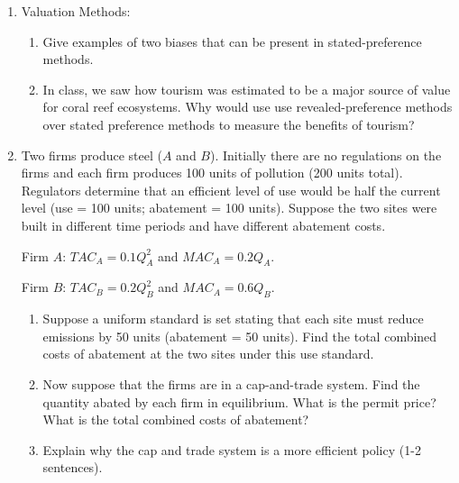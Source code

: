 \documentclass[11pt]{article}
\newcommand{\answer}[1]{\iftoggle{INCLUDEANSWERS}{{\color{violet!70!white}\textbf{Solution:} #1}}{} }
\newcommand{\points}[1]{\iftoggle{INCLUDEPOINTS}{{\color{blue!70!white}(#1 pts.)}}{}}
\begin{document}
\begin{enumerate}
  \item \points{10} Valuation Methods:
  \begin{enumerate}
    \item Give examples of two biases that can be present in stated-preference methods.
    \item In class, we saw how tourism was estimated to be a major source of value for coral reef ecosystems. Why would use use revealed-preference methods over stated preference methods to measure the benefits of tourism?
  \end{enumerate}

  \answer{
    \begin{enumerate}
      \item Strategic bias (lie to try and influence the policy decision), Information bias (don't know enough to put a price on something), Starting point bias (get told an initial number which frames their answer), hypothetical bias (people answer without considering what they actually would pay), status quo bias (need to be payed more to lose something that they already have)
      \item The hypothetical bias means people won't reveal what they actually would pay to preserve the coral reef. Revealed-preference is better in this case since you observe how much people actually paid to see the coral reef.
    \end{enumerate}
  }

  \item \points{20} Two firms produce steel ($A$ and $B$). Initially there are no regulations on the firms and each firm produces 100 units of pollution (200 units total). Regulators determine that an efficient level of use would be half the current level (use = 100 units; abatement = 100 units). Suppose the two sites were built in different time periods and have different abatement costs.
  
  Firm $A$: $TAC_A = 0.1Q_A^2$ and $MAC_A = 0.2 Q_A$.

  Firm $B$: $TAC_B = 0.2Q_B^2$ and $MAC_A = 0.6 Q_B$.
  
  \begin{enumerate}
    \item Suppose a uniform standard is set stating that each site must reduce emissions by 50 units (abatement = 50 units). Find the total combined costs of abatement at the two sites under this use standard.
    \item Now suppose that the firms are in a cap-and-trade system. Find the quantity abated by each firm in equilibrium. What is the permit price? What is the total combined costs of abatement?
    \item Explain why the cap and trade system is a more efficient policy (1-2 sentences).
  \end{enumerate}


\end{enumerate}
\end{document}
